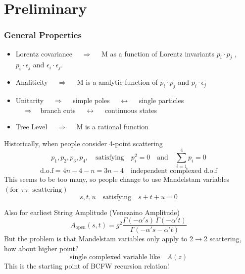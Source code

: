 \documentclass{beamer}
\begin{document}
\section{Preliminary}
\begin{frame}
    \frametitle{General Properties}
    \begin{itemize}
        \item Lorentz covariance $\quad \Rightarrow \quad$ M as a function of Lorentz invariants $p_i\cdot p_j$ , $p_i\cdot\epsilon_j$ and $\epsilon_i\cdot \epsilon_j$.
        \item Analiticity $\quad \Rightarrow \quad$ M is a analytic function of $p_i\cdot p_j$ and $p_i\cdot\epsilon_j$
        \item Unitarity $\quad \Rightarrow \quad$ simple poles $\quad \leftrightarrow \quad$ single particles\\
        \hspace{3.8em}$\quad\Rightarrow\quad$branch cuts $\quad \leftrightarrow\quad$ continuous states
        \item Tree Level $\quad \Rightarrow \quad$ M is a rational function
    \end{itemize}
    Historically, when people consider 4-point scattering 
\begin{equation*}
    p_1,p_2,p_3,p_4, \quad \text{satisfying}\quad p_i^2=0 \quad\text{and}\quad \sum_{i=1}^{4}p_i=0
\end{equation*}
\begin{equation*}
    \text{d.o.f}=4n-4-n=3n-4\quad \text{independent complexed d.o.f}
\end{equation*}
This seems to be too many, so people change to use Mandelstam variables $(\text{for}~~\pi\pi~~\text{scattering})$
\begin{equation*}
    s,t,u\quad\text{satisfying}\quad s+t+u=0
\end{equation*}
\end{frame}

\begin{frame}
    Also for earliest String Amplitude (Venezaino Amplitude)
    \begin{equation*}
        A_{\text{open}}(s, t) = g^2 \frac{\Gamma(-\alpha' s)\, \Gamma(-\alpha' t)}{\Gamma(-\alpha' s - \alpha' t)}
    \end{equation*}
   But the problem is that Mandelstam variables only apply to 2$\rightarrow$2 scattering, how about higher point?
   \begin{equation*}
    \text{single complexed variable like}\quad A(z) 
   \end{equation*}
   This is the starting point of BCFW recursion relation!
\end{frame}
\end{document}
